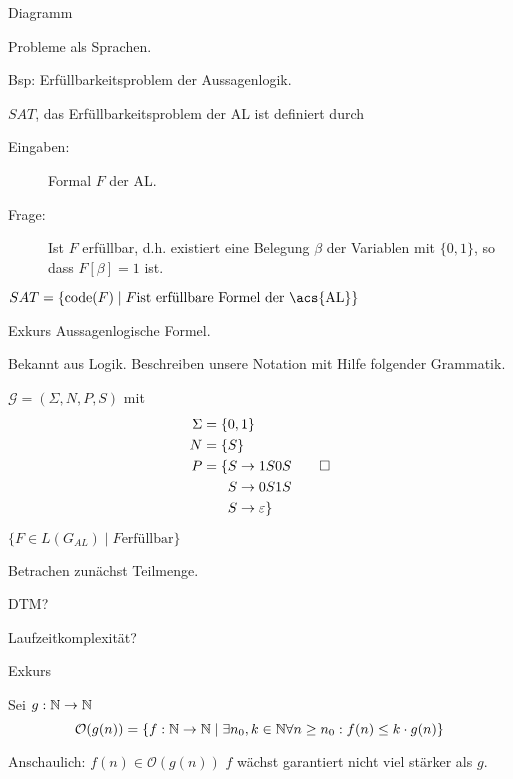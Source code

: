 Diagramm

\bigskip

Probleme als Sprachen.

Bsp: Erfüllbarkeitsproblem der Aussagenlogik.

\begin{Def}[name={[$SAT$: Erfüllbarkeitsproblem der \acs*{AL}]}]
	$SAT$, das Erfüllbarkeitsproblem der \acf{AL} ist  definiert durch
	\begin{description}
	\item[Eingaben:] Formal $F$ der \acl{AL}.
	\item[Frage:] Ist $F$ erfüllbar, d.h. existiert eine Belegung $\beta$ der Variablen mit $\{0,1\}$, so dass $F[\beta]=1$ ist.
	\end{description}
	$SAT=\{\code(F) \mid F\text{ist erfüllbare Formel der \acs{AL}}\}$
\end{Def}

Exkurs Aussagenlogische Formel.

Bekannt aus Logik. Beschreiben unsere Notation mit Hilfe folgender Grammatik.

\begin{Bsp}\label{bsp:3.sameNumber}
  $\mathcal{G} = (\Sigma, N, P, S)$ mit
	\begin{align*}
		\Sigma &= \{ 0, 1 \}\\
		N &= \{S\}\\
		P &= \begin{aligned}[t]
      \{ S & \to 1S0S \\
        S & \to 0S1S \\
        S & \to \varepsilon
      \}
        \end{aligned}
      \qedhere
	\end{align*}
\end{Bsp}


$\{F\in L(G_{AL})\mid F \text{erfüllbar}\}$

Betrachen zunächst Teilmenge.

DTM?

Laufzeitkomplexität?

Exkurs
\begin{Def} Sei $g:\mathbb{N}\rightarrow\mathbb{N}$
$$\mathcal{O}(g(n)) = \{f:\mathbb{N}\rightarrow\mathbb{N} \mid \exists n_0, k\in\mathbb{N} \forall n\geq n_0: f(n)\leq k\cdot g(n)\}$$
\end{Def}

Anschaulich: $f(n)\in \mathcal{O}(g(n))$ $f$ wächst garantiert nicht viel stärker als $g$.


\bigskip

